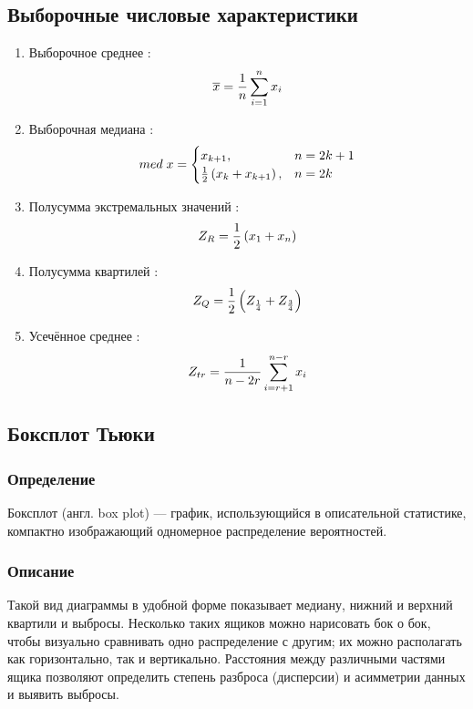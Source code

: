 \documentclass[a4]{article}
\begin{document}
		\subsection{Выборочные числовые характеристики}
				\begin{enumerate}
				\item Выборочное среднее \cite{average}:
				\begin{equation}\label{eqn:average}
				\overline{x} = \frac{1}{n}\sum_{i=1}^n x_i \hfill  
				\end{equation}
				\item Выборочная медиана \cite{med}:
				\begin{equation}
				med\; x = \begin{cases}
				x_{k+1}, & n = 2k+1\\
				\frac{1}{2}\left(x_k+x_{k+1}\right), & n = 2k
				\end{cases} \hfill  \label{eqn:med}
				\end{equation}
				\item Полусумма экстремальных значений \cite{mean_extr}:
				\begin{equation}
				Z_R = \frac{1}{2}\left(x_1+x_n\right) \hfill  \label{eqn:mean_extr}
				\end{equation}
				\item Полусумма квартилей \cite{quartiles}:
				\begin{equation}
				Z_Q = \frac{1}{2}\left(Z_{\frac{1}{4}}+Z_{\frac{3}{4}}\right) \hfill  \label{eqn:quartiles}
				\end{equation}
				\item Усечённое среднее \cite{cut_mean}:
				\begin{equation}
				Z_{tr} = \frac{1}{n - 2r}\sum_{i=r+1}^{n-r} x_i \hfill  \label{eqn:cut_mean}
				\end{equation}
			\end{enumerate}	
			
			\subsection{Боксплот Тьюки}
			\subsubsection{Определение}
			Боксплот (англ. box plot) — график, использующийся в описательной статистике, компактно изображающий одномерное распределение вероятностей.
			
			\subsubsection{Описание}
			Такой вид диаграммы в удобной форме показывает медиану, нижний и верхний квартили и выбросы. Несколько таких ящиков можно нарисовать бок
			о бок, чтобы визуально сравнивать одно распределение с другим; их можно располагать как горизонтально, так и вертикально. Расстояния между
			различными частями ящика позволяют определить степень разброса (дисперсии) и асимметрии данных и выявить выбросы.
\end{document}
